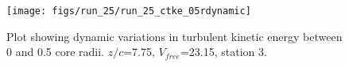 \begin{figure}[H]
\centering
\texttt{[image: figs/run\_25/run\_25\_ctke\_05rdynamic]}
\caption{Plot showing dynamic variations in turbulent kinetic energy between 0 and 0.5 core radii. $z/c$=7.75, $V_{free}$=23.15, station 3.}
\label{fig:run_25_ctke_05rdynamic}
\end{figure}


